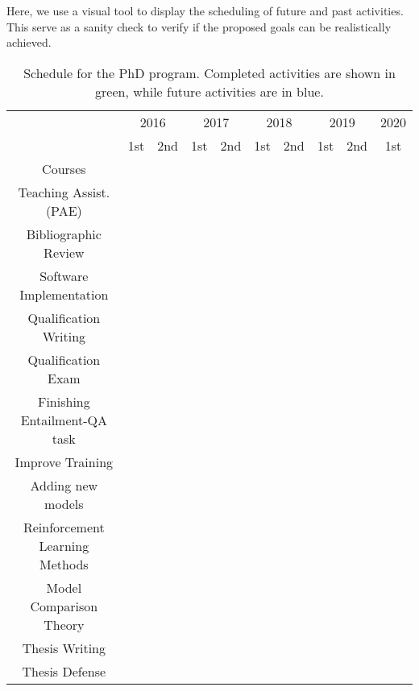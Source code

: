 Here, we use a visual tool to display the scheduling of future and past activities. This serve as a sanity check to verify if the
proposed goals can be realistically achieved.

\begin{table}[ht!]
  \center
  \begin{tabular}{|c|c|c|c|c|c|c|c|c|c|}\hline
    & \multicolumn{2}{c|}{2016} & \multicolumn{2}{c|}{2017} & \multicolumn{2}{c|}{2018} & \multicolumn{2}{c|}{2019} & \multicolumn{1}{c|}{2020} \\ \cline{2-10}
    \raisebox{1.5ex}{Activity} & 1st & 2nd & 1st & 2nd & 1st & 2nd & 1st & 2nd & 1st \\ \hline \hline
    Courses & \cellcolor{green!45} & \cellcolor{green!45} & \cellcolor{green!45}  & \cellcolor{green!45}  &  &  & & & \\ \hline
    Teaching Assist. (PAE) & & &  &  &\cellcolor{green!45}  &  & & & \\ \hline
    Bibliographic Review & \cellcolor{green!45} & \cellcolor{green!45} & \cellcolor{green!45} & \cellcolor{green!45} & \cellcolor{green!45} & &  &  & \\ \hline 
    Software Implementation & & & & \cellcolor{green!45} &\cellcolor{green!45}  & \cellcolor{blue!45} &\cellcolor{blue!45}&\cellcolor{blue!45}& \\ \hline
    Qualification Writing & & & & & \cellcolor{green!45} & &  & & \\ \hline
    Qualification Exam & & & & & \cellcolor{green!45} & & & & \\ \hline
    Finishing Entailment-QA task & & & & & & \cellcolor{blue!45} &  & & \\ \hline
    Improve Training & & & & & & \cellcolor{blue!45} &  & & \\ \hline
    Adding new models & & & & & & \cellcolor{blue!45} &\cellcolor{blue!45}  & & \\ \hline
    Reinforcement Learning Methods & & & & & & &\cellcolor{blue!45}  &\cellcolor{blue!45} & \\ \hline
    Model Comparison Theory & & & & & & &\cellcolor{blue!45}  &\cellcolor{blue!45} & \\ \hline
    Thesis Writing & & & & & & & & \cellcolor{blue!45} & \\ \hline
    Thesis Defense & & & & & & & & & \cellcolor{blue!45}  \\ \hline
  \end{tabular}
  \caption{Schedule for the PhD program. Completed activities are shown in green, while future activities are in blue.}
  \label{tab:schedule}
\end{table}